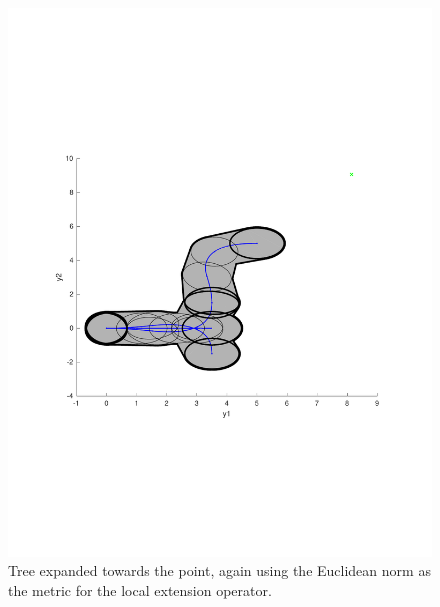 \begin{figure}
\includegraphics[scale=.5]{figures/rrtfunnel/euclidean-distance-closest-funnel2}
\caption{Tree expanded towards the point, again using the Euclidean norm as the
  metric for the local extension operator.}
\end{figure}

